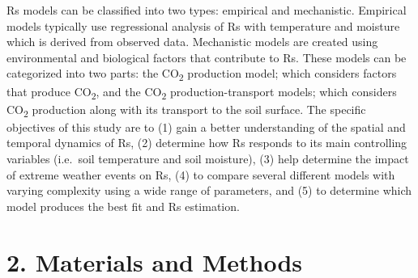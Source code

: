 \documentclass[]{elsarticle} %
\begin{document}
\newline Rs models can be classified into two types: empirical and
mechanistic. Empirical models typically use regressional analysis of Rs
with temperature and moisture which is derived from observed data.
Mechanistic models are created using environmental and biological
factors that contribute to Rs. These models can be categorized into two
parts: the CO\textsubscript{2} production model; which considers factors
that produce CO\textsubscript{2}, and the CO\textsubscript{2}
production-transport models; which considers CO\textsubscript{2}
production along with its transport to the soil surface. \newline
\newline The specific objectives of this study are to (1) gain a better
understanding of the spatial and temporal dynamics of Rs, (2) determine
how Rs responds to its main controlling variables (i.e.~soil temperature
and soil moisture), (3) help determine the impact of extreme weather
events on Rs, (4) to compare several different models with varying
complexity using a wide range of parameters, and (5) to determine which
model produces the best fit and Rs estimation.

\hypertarget{materials-and-methods}{%
\section{2. Materials and Methods}\label{materials-and-methods}}
\end{document}
